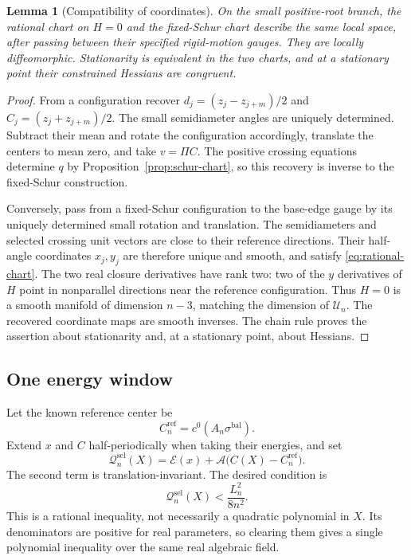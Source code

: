 \documentclass[11pt,reqno]{amsart}
\numberwithin{equation}{section}
\newtheorem{lemma}[theorem]{Lemma}
\theoremstyle{definition}
\theoremstyle{remark}
\newcommand{\A}{\mathcal A}
\newcommand{\E}{\mathcal E}
\newcommand{\bal}{\mathrm{bal}}
\newcommand{\UU}{\mathscr U_n}
\begin{document}
\begin{lemma}[Compatibility of coordinates]\label{lem:chart-equivalence}
On the small positive-root branch, the rational chart on $H=0$ and the fixed-Schur chart describe the same local space, after passing between their specified rigid-motion gauges. They are locally diffeomorphic. Stationarity is equivalent in the two charts, and at a stationary point their constrained Hessians are congruent.
\end{lemma}
\begin{proof}
From a configuration recover
$d_j=(z_j-z_{j+m})/2$ and $C_j=(z_j+z_{j+m})/2$. The small semidiameter angles are uniquely determined. Subtract their mean and rotate the configuration accordingly, translate the centers to mean zero, and take $v=\Pi C$. The positive crossing equations determine $q$ by Proposition~\ref{prop:schur-chart}, so this recovery is inverse to the fixed-Schur construction.

Conversely, pass from a fixed-Schur configuration to the base-edge gauge by its uniquely determined small rotation and translation. The semidiameters and selected crossing unit vectors are close to their reference directions. Their half-angle coordinates $x_j,y_j$ are therefore unique and smooth, and satisfy \eqref{eq:rational-chart}. The two real closure derivatives have rank two: two of the $y$ derivatives of $H$ point in nonparallel directions near the reference configuration. Thus $H=0$ is a smooth manifold of dimension $n-3$, matching the dimension of $\UU$. The recovered coordinate maps are smooth inverses. The chain rule proves the assertion about stationarity and, at a stationary point, about Hessians.
\end{proof}

\subsection{One energy window}
Let the known reference center be
\[
 C_n^{\mathrm{ref}}=c^0(A_n\sigma^{\bal}).
\]
Extend $x$ and $C$ half-periodically when taking their energies, and set
\begin{equation}\label{eq:selector-energy}
 \mathcal Q_n^{\mathrm{sel}}(X)
 =\E(x)+\A\bigl(C(X)-C_n^{\mathrm{ref}}\bigr).
\end{equation}
The second term is translation-invariant. The desired condition is
\begin{equation}\label{eq:energy-window}
 \mathcal Q_n^{\mathrm{sel}}(X)<\frac{L_n^2}{8n^2}.
\end{equation}
This is a rational inequality, not necessarily a quadratic polynomial in $X$. Its denominators are positive for real parameters, so clearing them gives a single polynomial inequality over the same real algebraic field.
\end{document}
